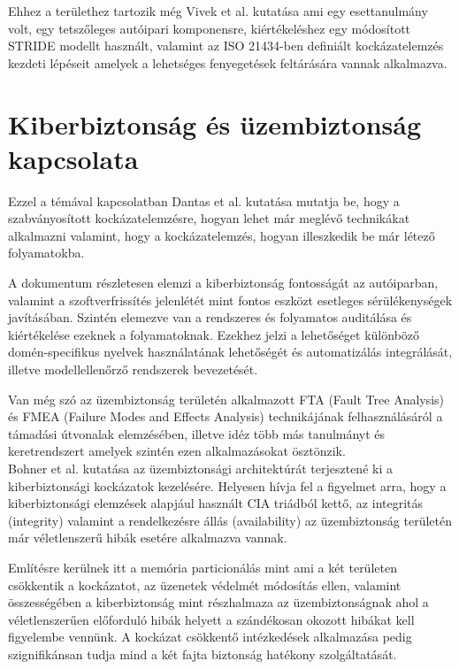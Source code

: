 Ehhez a területhez tartozik még Vivek et al.\cite{Vivek} kutatása ami egy esettanulmány volt, egy tetszőleges autóipari komponensre, kiértékeléshez egy módosított STRIDE modellt használt, valamint az ISO 21434-ben definiált kockázatelemzés kezdeti lépéseit amelyek a lehetséges fenyegetések feltárására vannak alkalmazva.

\section{Kiberbiztonság és üzembiztonság kapcsolata}

Ezzel a témával kapcsolatban Dantas et al. \cite{Dantas} kutatása mutatja be, hogy a szabványosított kockázatelemzésre, hogyan lehet már meglévő technikákat alkalmazni valamint, hogy a kockázatelemzés, hogyan illeszkedik be már létező folyamatokba. 

A dokumentum részletesen elemzi a kiberbiztonság fontosságát az autóiparban, valamint a szoftverfrissítés jelenlétét mint fontos eszközt esetleges sérülékenységek javításában. Szintén elemezve van a rendszeres és folyamatos auditálása és kiértékelése ezeknek a folyamatoknak. Ezekhez jelzi a lehetőséget különböző domén-specifikus nyelvek használatának lehetőségét és automatizálás integrálását, illetve modellellenőrző rendszerek bevezetését. 

Van még szó az üzembiztonság területén alkalmazott FTA (Fault Tree Analysis) és FMEA (Failure Modes and Effects Analysis) technikájának felhasználásáról a támadási útvonalak elemzésében, illetve idéz több más tanulmányt és keretrendszert amelyek szintén ezen alkalmazásokat ösztönzik.\\

Bohner et al.\cite{Bohner} kutatása az üzembiztonsági architektúrát terjesztené ki a kiberbiztonsági kockázatok kezelésére. Helyesen hívja fel a figyelmet arra, hogy a kiberbiztonsági elemzések alapjául használt CIA triádból kettő, az integritás (integrity) valamint a rendelkezésre állás (availability) az üzembiztonság területén már véletlenszerű hibák esetére alkalmazva vannak. 

Említésre kerülnek itt a memória particionálás mint ami a két területen csökkentik a kockázatot, az üzenetek védelmét módosítás ellen, valamint összességében a kiberbiztonság mint részhalmaza az üzembiztonságnak ahol a véletlenszerűen előforduló hibák helyett a szándékosan okozott hibákat kell figyelembe vennünk. A kockázat csökkentő intézkedések alkalmazása pedig szignifikánsan tudja mind a két fajta biztonság hatékony szolgáltatását.\\

